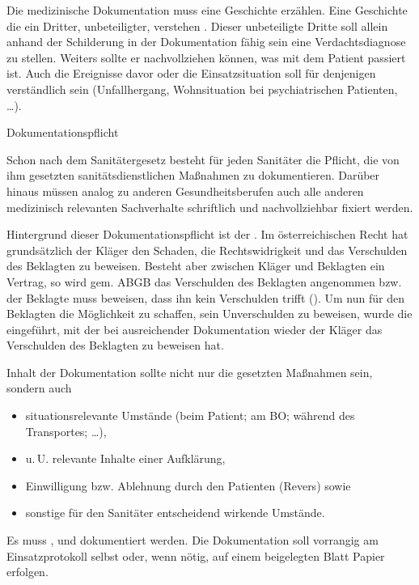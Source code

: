  {Die medizinische Dokumentation
muss eine Geschichte erzählen. Eine Geschichte die ein
Dritter, unbeteiligter, verstehen . Dieser
unbeteiligte Dritte soll allein anhand der
Schilderung in der Dokumentation fähig sein eine
Verdachtsdiagnose zu stellen. Weiters sollte er
nachvollziehen können, was mit dem Patient passiert ist.
Auch die Ereignisse davor oder die Einsatzsituation soll
für denjenigen verständlich sein (Unfallhergang,
Wohnsituation bei psychiatrischen Patienten, \ldots).
}

\begin{Synopsis}
\end{Synopsis}


\Text
{Dokumentationspflicht}
{%
Schon nach dem Sanitätergesetz besteht für jeden Sanitäter
die Pflicht, die von ihm gesetzten
sanitätsdienstlichen Maßnahmen zu
dokumentieren. Darüber hinaus müssen
analog zu anderen Gesundheitsberufen auch alle anderen
medizinisch relevanten Sachverhalte schriftlich und
nachvollziehbar fixiert werden.

Hintergrund dieser Dokumentationspflicht ist der
.
Im österreichischen Recht hat grundsätzlich der Kläger den
Schaden, die Rechtswidrigkeit und das Verschulden des
Beklagten zu beweisen. Besteht aber zwischen Kläger und
Beklagten ein Vertrag, so wird gem.  ABGB das
Verschulden des Beklagten angenommen bzw. der Beklagte muss
beweisen, dass ihn kein Verschulden trifft
().
Um nun für den Beklagten die Möglichkeit zu schaffen, sein
Unverschulden zu beweisen, wurde die
 eingeführt, mit der bei
ausreichender Dokumentation wieder der Kläger das
Verschulden des Beklagten zu beweisen hat.


Inhalt der Dokumentation sollte nicht nur die 
gesetzten Maßnahmen sein, sondern auch 
\begin{itemize}
  \item situationsrelevante
  Umstände (beim Patient; am BO; während des Transportes;
  {\dots}),
  \item  u.\,U. relevante Inhalte einer Aufklärung,
  \item Einwilligung bzw. Ablehnung durch den Patienten
  (Revers) sowie
  \item sonstige für den Sanitäter entscheidend wirkende
  Umstände.
\end{itemize}



Es muss ,  und
 dokumentiert werden.
Die Dokumentation soll vorrangig am Einsatzprotokoll selbst
oder, wenn nötig, auf einem beigelegten
Blatt Papier erfolgen.
}
{}
{}
{}
{}


